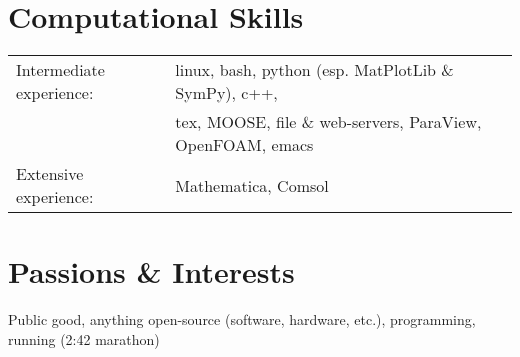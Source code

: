 \documentclass[a4paper,10pt]{article} %
\begin{document}
\FloatBarrier


\section{Computational Skills}

\begin{tabular}{ll}

Intermediate experience: & linux, bash, python (esp. MatPlotLib \& SymPy), c++,\\
& tex, MOOSE, file \& web-servers, ParaView, OpenFOAM, emacs\\

Extensive experience: & Mathematica, Comsol

\end{tabular}


\section{Passions \& Interests}

Public good, anything open-source (software, hardware, etc.), programming, running (2:42 marathon)\\

\end{document}
